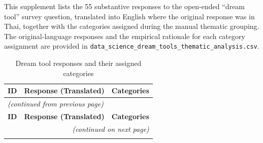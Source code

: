 \documentclass[11pt]{article}
\begin{document}
This supplement lists the 55 substantive responses to the open-ended ``dream tool'' survey question, translated into English where the original response was in Thai, together with the categories assigned during the manual thematic grouping. The original-language responses and the empirical rationale for each category assignment are provided in \texttt{data\_science\_dream\_tools\_thematic\_analysis.csv}.

\begin{longtable}{l p{8.5cm} p{4.5cm}}
\caption{Dream tool responses and their assigned categories}
\label{tab:supp_dream_tools} \\
\toprule
\textbf{ID} & \textbf{Response (Translated)} & \textbf{Categories} \\
\midrule
\endfirsthead

\multicolumn{3}{l}{\textit{(continued from previous page)}} \\
\midrule
\textbf{ID} & \textbf{Response (Translated)} & \textbf{Categories} \\
\midrule
\endhead

\midrule
\multicolumn{3}{r}{\textit{(continued on next page)}} \\
\endfoot

\bottomrule
\endlastfoot


\end{longtable}
\end{document}
